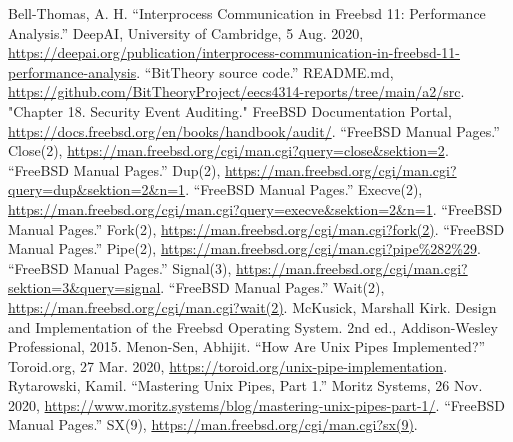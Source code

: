 \documentclass[12pt, dvipsnames, a4paper]{article}
\begin{document}
\begin{thebibliography}{00}
	 Bell-Thomas, A. H. “Interprocess Communication in Freebsd 11: Performance Analysis.” DeepAI, University of Cambridge, 5 Aug. 2020, \href{https://deepai.org/publication/interprocess-communication-in-freebsd-11-performance-analysis}{https://deepai.org/publication/interprocess-communication-in-freebsd-11-performance-analysis}.
	 “BitTheory source code.” README.md, \href{https://github.com/BitTheoryProject/eecs4314-reports/tree/main/a2/src}{https://github.com/BitTheoryProject/eecs4314-reports/tree/main/a2/src}.
	 "Chapter 18. Security Event Auditing." FreeBSD Documentation Portal, \href{https://docs.freebsd.org/en/books/handbook/audit/}{https://docs.freebsd.org/en/books/handbook/audit/}.
	 “FreeBSD Manual Pages.” Close(2), \href{https://man.freebsd.org/cgi/man.cgi?query=close\&sektion=2}{https://man.freebsd.org/cgi/man.cgi?query=close\&sektion=2}.
	 “FreeBSD Manual Pages.” Dup(2), \href{https://man.freebsd.org/cgi/man.cgi?query=dup\&sektion=2\&n=1}{https://man.freebsd.org/cgi/man.cgi?query=dup\&sektion=2\&n=1}.
	 “FreeBSD Manual Pages.” Execve(2), \href{https://man.freebsd.org/cgi/man.cgi?query=execve\&sektion=2\&n=1}{https://man.freebsd.org/cgi/man.cgi?query=execve\&sektion=2\&n=1}.
	 “FreeBSD Manual Pages.” Fork(2), \href{https://man.freebsd.org/cgi/man.cgi?fork(2)}{https://man.freebsd.org/cgi/man.cgi?fork(2)}.
	 “FreeBSD Manual Pages.” Pipe(2), \href{https://man.freebsd.org/cgi/man.cgi?pipe\%282\%29}{https://man.freebsd.org/cgi/man.cgi?pipe\%282\%29}.
	 “FreeBSD Manual Pages.” Signal(3), \href{https://man.freebsd.org/cgi/man.cgi?sektion=3\&query=signal}{https://man.freebsd.org/cgi/man.cgi?sektion=3\&query=signal}.
	 “FreeBSD Manual Pages.” Wait(2), \href{https://man.freebsd.org/cgi/man.cgi?wait(2)}{https://man.freebsd.org/cgi/man.cgi?wait(2)}.
	 McKusick, Marshall Kirk. Design and Implementation of the Freebsd Operating System. 2nd ed., Addison-Wesley Professional, 2015.
	 Menon-Sen, Abhijit. “How Are Unix Pipes Implemented?” Toroid.org, 27 Mar. 2020, \href{https://toroid.org/unix-pipe-implementation}{https://toroid.org/unix-pipe-implementation}.
	Rytarowski, Kamil. “Mastering Unix Pipes, Part 1.” Moritz Systems, 26 Nov. 2020, \href{https://www.moritz.systems/blog/mastering-unix-pipes-part-1/}{https://www.moritz.systems/blog/mastering-unix-pipes-part-1/}.
	 “FreeBSD Manual Pages.” SX(9), \href{https://man.freebsd.org/cgi/man.cgi?sx(9)}{https://man.freebsd.org/cgi/man.cgi?sx(9)}.
\end{thebibliography}
\end{document}
